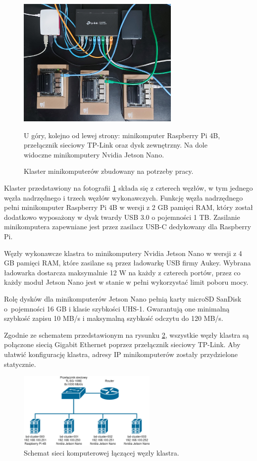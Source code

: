 \begin{figure}[h]
	\centering
	\includegraphics[width=0.7\textwidth]{graf/Cluster-picture.jpg}
	\caption{Klaster minikomputerów zbudowany na potrzeby pracy.}
	\medskip \small
	U góry, kolejno od lewej strony: minikomputer Raspberry Pi 4B, przełącznik sieciowy
	TP-Link oraz dysk zewnętrzny. Na dole widoczne minikomputery Nvidia Jetson Nano.
	\label{pic:cluster-photo}
\end{figure}

Klaster przedstawiony na fotografii \ref{pic:cluster-photo} składa się z czterech węzłów, w tym
jednego węzła nadrzędnego i trzech węzłów wykonawczych. Funkcję węzła nadrzędnego pełni
minikomputer Raspberry Pi 4B w wersji z 2 GB pamięci RAM, który został dodatkowo wyposażony w
dysk twardy USB 3.0 o pojemności 1 TB. Zasilanie minikomputera zapewniane jest przez
zasilacz USB-C dedykowany dla Raspberry Pi.
\newpage

Węzły wykonawcze klastra to minikomputery Nvidia Jetson Nano w wersji z 4 GB pamięci RAM, które
zasilane są przez ładowarkę USB firmy Aukey. Wybrana ładowarka dostarcza maksymalnie 12 W na
każdy z czterech portów, przez co każdy moduł Jetson Nano jest w stanie w pełni wykorzystać
limit poboru mocy.

Rolę dysków dla minikomputerów Jetson Nano pełnią karty microSD SanDisk o~pojemności 16 GB i
klasie szybkości UHS-1. Gwarantują one minimalną szybkość zapisu 10 MB/s i maksymalną
szybkość odczytu do 120 MB/s.

Zgodnie ze schematem przedstawionym na rysunku \ref{fig:cluster-network}, wszystkie węzły
klastra są połączone siecią Gigabit Ethernet poprzez przełącznik sieciowy TP-Link.
Aby ułatwić konfigurację klastra, adresy IP minikomputerów zostały przydzielone statycznie.

\begin{figure}[h]
	\centering
	\includegraphics[width=0.6\textwidth]{graf/Cluster-network.png}
	\caption{Schemat sieci komputerowej łączącej węzły klastra.}
	\label{fig:cluster-network}
\end{figure}

